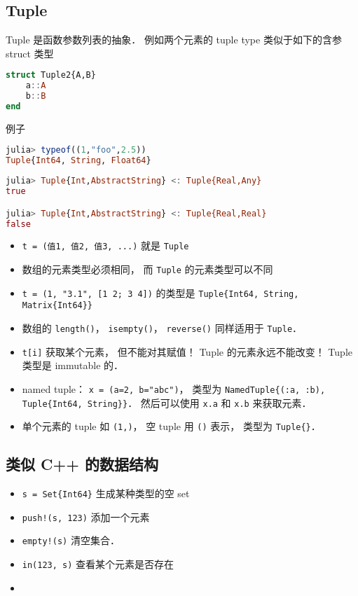 \subsection{Tuple}
Tuple 是函数参数列表的抽象． 例如两个元素的 tuple type 类似于如下的含参 struct 类型
\begin{lstlisting}[language=julia]
struct Tuple2{A,B}
    a::A
    b::B
end
\end{lstlisting}
例子
\begin{lstlisting}[language=julia]
julia> typeof((1,"foo",2.5))
Tuple{Int64, String, Float64}
\end{lstlisting}
\begin{lstlisting}[language=julia]
julia> Tuple{Int,AbstractString} <: Tuple{Real,Any}
true

julia> Tuple{Int,AbstractString} <: Tuple{Real,Real}
false
\end{lstlisting}

\begin{itemize}
\item \verb|t = (值1, 值2, 值3, ...)| 就是 \verb|Tuple|
\item 数组的元素类型必须相同， 而 \verb|Tuple| 的元素类型可以不同
\item \verb|t = (1, "3.1", [1 2; 3 4])| 的类型是 \verb|Tuple{Int64, String, Matrix{Int64}}|
\item 数组的 \verb|length()|， \verb|isempty()|， \verb|reverse()| 同样适用于 \verb|Tuple|．
\item \verb|t[i]| 获取某个元素， 但不能对其赋值！ Tuple 的元素永远不能改变！ Tuple 类型是 immutable 的．
\item named tuple： \verb|x = (a=2, b="abc")|， 类型为 \verb|NamedTuple{(:a, :b), Tuple{Int64, String}}|． 然后可以使用 \verb|x.a| 和 \verb|x.b| 来获取元素．
\item 单个元素的 tuple 如 \verb|(1,)|， 空 tuple 用 \verb|()| 表示， 类型为 \verb|Tuple{}|．
\end{itemize}

\subsection{类似 C++ 的数据结构}
\begin{itemize}
\item \verb|s = Set{Int64}| 生成某种类型的空 set
\item \verb|push!(s, 123)| 添加一个元素
\item \verb|empty!(s)| 清空集合．
\item \verb|in(123, s)| 查看某个元素是否存在
\item \verb||
\end{itemize}


